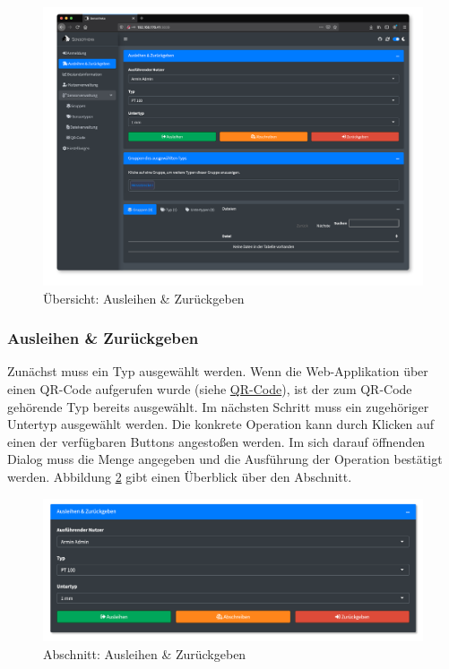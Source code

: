 \documentclass[
]{article}
\begin{document}
\begin{figure}
\centering
\includegraphics{./img/operate_overview.png}
\caption{\label{fig:operate-overview}Übersicht: Ausleihen \& Zurückgeben}
\end{figure}

\hypertarget{ausleihen-zuruxfcckgeben}{%
\subsubsection{Ausleihen \& Zurückgeben}\label{ausleihen-zuruxfcckgeben}}

Zunächst muss ein Typ ausgewählt werden. Wenn die Web-Applikation über einen QR-Code aufgerufen wurde (siehe \protect\hyperlink{qrcode}{QR-Code}), ist der zum QR-Code gehörende Typ bereits ausgewählt. Im nächsten Schritt muss ein zugehöriger Untertyp ausgewählt werden. Die konkrete Operation kann durch Klicken auf einen der verfügbaren Buttons angestoßen werden. Im sich darauf öffnenden Dialog muss die Menge angegeben und die Ausführung der Operation bestätigt werden. Abbildung \ref{fig:operate-detail-circulate} gibt einen Überblick über den Abschnitt.

\begin{figure}
\centering
\includegraphics{./img/operate_detail_circulate.png}
\caption{\label{fig:operate-detail-circulate}Abschnitt: Ausleihen \& Zurückgeben}
\end{figure}
\end{document}
